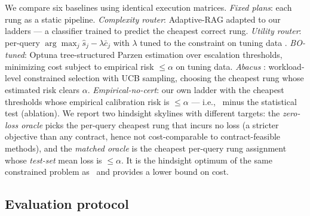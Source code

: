 We compare six baselines using identical execution matrices.
\emph{Fixed plans}: each rung as a static pipeline. \emph{Complexity
router}: Adaptive-RAG \citep{jeong2024adaptiverag} adapted to our
ladders --- a classifier trained to predict the cheapest correct rung.
\emph{Utility router}: per-query
$\arg\max_j \hat{s}_j - \lambda \bar c_j$ with $\lambda$ tuned to the
constraint on tuning data
\citep{ding2024hybridllm,hu2024routerbench}. \emph{BO-tuned}:
Optuna \citep{akiba2019optuna} tree-structured Parzen estimation over
escalation thresholds, minimizing cost subject to empirical risk
$\le \alpha$ on tuning data. \emph{Abacus} \citep{russo2025abacus}:
workload-level constrained selection with UCB sampling, choosing the
cheapest rung whose estimated risk clears $\alpha$.
\emph{Empirical-no-cert}: our own ladder with the cheapest thresholds
whose empirical calibration risk is $\le\alpha$ --- i.e., \system\
minus the statistical test (ablation). We report two hindsight
skylines with different targets: the \emph{zero-loss oracle} picks the
per-query cheapest rung that incurs no loss (a stricter objective than
any contract, hence not cost-comparable to contract-feasible methods),
and the \emph{matched oracle} is the cheapest per-query rung assignment
whose \emph{test-set} mean loss is $\le \alpha$. It is the hindsight
optimum of the same constrained problem as \system\ and provides a
lower bound on cost.

\subsection{Evaluation protocol}
\label{sec:protocol}

